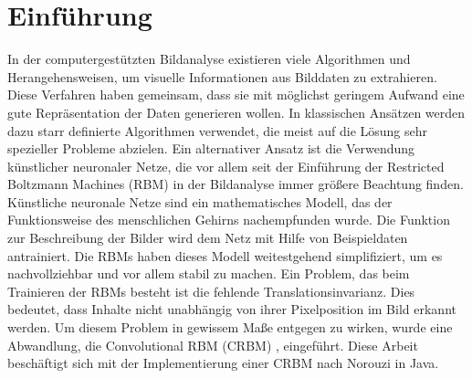 \section{Einführung}\label{introduction}
In der computergestützten Bildanalyse existieren viele Algorithmen und Herangehensweisen, um visuelle Informationen aus Bilddaten zu extrahieren. Diese Verfahren haben gemeinsam, dass sie mit möglichst geringem Aufwand eine gute Repräsentation der Daten generieren wollen. In klassischen Ansätzen werden dazu starr definierte Algorithmen verwendet, die meist auf die Lösung sehr spezieller Probleme abzielen. Ein alternativer Ansatz ist die Verwendung künstlicher neuronaler Netze, die vor allem seit der Einführung der Restricted Boltzmann Machines (RBM) \cite{Hinton06} in der Bildanalyse immer größere Beachtung finden. Künstliche neuronale Netze sind ein mathematisches Modell, das der Funktionsweise des menschlichen Gehirns nachempfunden wurde. Die Funktion zur Beschreibung der Bilder wird dem Netz mit Hilfe von Beispieldaten antrainiert. Die RBMs haben dieses Modell weitestgehend simplifiziert, um es nachvollziehbar und vor allem stabil zu machen. Ein Problem, das beim Trainieren der RBMs besteht ist die fehlende Translationsinvarianz. Dies bedeutet, dass Inhalte nicht unabhängig von ihrer Pixelposition im Bild erkannt werden. Um diesem Problem in gewissem Maße entgegen zu wirken, wurde eine Abwandlung, die Convolutional RBM (CRBM) \cite{Norouzi09}, \cite{Lee09} eingeführt. Diese Arbeit beschäftigt sich mit der Implementierung einer CRBM nach Norouzi \cite{NorouziMaster} in Java.